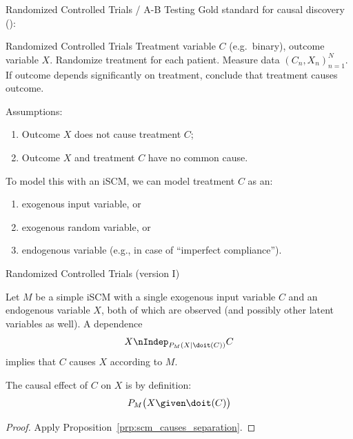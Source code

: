 \begin{frame}{Randomized Controlled Trials / A-B Testing}
  Gold standard for causal discovery (\cite{vanHelmont1648}):
  \begin{block}{Randomized Controlled Trials}
  Treatment variable $C$ (e.g.\ binary), outcome variable $X$.
  Randomize treatment for each patient.
  Measure data $(C_n,X_n)_{n=1}^N$.
  If outcome depends significantly on treatment, conclude that treatment causes outcome.
  \end{block}

  Assumptions:
  \begin{enumerate}
    \item Outcome $X$ does not cause treatment $C$;
    \item Outcome $X$ and treatment $C$ have no common cause.
  \end{enumerate}

  \bigskip
  To model this with an iSCM, we can model treatment $C$ as an:
  \begin{enumerate}
    \item exogenous input variable, or
    \item exogenous random variable, or
    \item endogenous variable (e.g., in case of ``imperfect compliance'').
  \end{enumerate}
\end{frame}

\begin{frame}{Randomized Controlled Trials (version I)}
\begin{Prp}[\ref{prp:RCT1}]
Let $M$ be a simple iSCM with a single exogenous input variable $C$ and an 
endogenous variable $X$, both of which are observed (and possibly other latent variables as well).
A dependence 
  $$X \nIndep_{P_{M}(X\mid\doit(C))} C $$
implies that $C$ causes $X$ according to $M$. 

The causal effect of $C$ on $X$ is by definition:
  $$P_{M}\big(X \given \doit(C)\big)$$
\end{Prp}
\begin{proof}
  Apply Proposition~\ref{prp:scm_causes_separation}.
\end{proof}
\end{frame}

